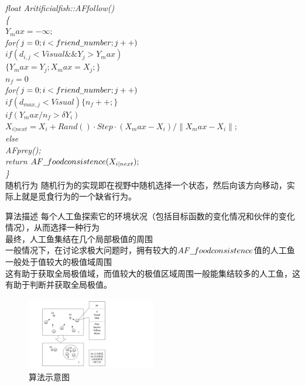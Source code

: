 \documentclass[UTF8]{ctexart}
\begin{document}
\begin{section}
\begin{subsection}
			\flushleft\scriptsize{\emph{float Aritificial\underline{\hspace{0.5em}}fish::AF\underline{\hspace{0.5em}}follow() \\ {\{} \\ {\qquad $Y_max=-\infty;$} \\ {\qquad for($j=0;i<friend\underline{\hspace{0.5em}}number;j++)$} \\ {\qquad\qquad $if(d_{i,j}<Visual \&\& Y_j>Y_max)$} \\ {\qquad\qquad\qquad $\{ Y_max=Y_j; X_max=X_j; \}$ }\\{\qquad $n_f=0$}\\{\qquad for($j=0;i<friend\underline{\hspace{0.5em}}number;j++)$}\\{\qquad\qquad $if(d_{max,j}<Visual) \{ n_f++;\} $}\\{\qquad $if (Y_max/n_f>\delta Y_i)$}\\{\qquad\qquad $X_{i|next}=X_i+Rand()·Step·(X_max-X_i)/\lVert X_max-X_i\rVert;$}\\{\qquad else}\\{\qquad\qquad AF\underline{\hspace{0.5em}}prey();}\\{ return $AF\underline{\hspace{0.5em}}foodconsistence(X_{i|next});$} \\{\}} }}\\
		\small{随机行为}
		随机行为的实现即在视野中随机选择一个状态，然后向该方向移动，实际上就是觅食行为的一个缺省行为。
	\end{subsection}
	\begin{subsection}{算法描述}
	每个人工鱼探索它的环境状况（包括目标函数的变化情况和伙伴的变化情况），从而选择一种行为\\最终，人工鱼集结在几个局部极值的周围\\一般情况下，在讨论求极大问题时，拥有较大的$AF\underline{\hspace{0.5em}}foodconsistence$值的人工鱼一般处于值较大的极值域周围\\这有助于获取全局极值域，而值较大的极值区域周围一般能集结较多的人工鱼，这有助于判断并获取全局极值。
		\begin{figure}[htbp]
			\centering
			\includegraphics[width=0.5\textwidth]{../../pic/fish3.pdf}
			\caption{算法示意图}
		\end{figure}
	\end{subsection}
\end{section}
\end{document}

